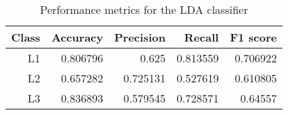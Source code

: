     \begin{table}  \centering \caption{Performance metrics for the LDA classifier}  \label{tab:results_lda} \begin{tabular}{rrrrr}    \hline\hline    \textbf{Class} & \textbf{Accuracy} & \textbf{Precision} & \textbf{Recall} & \textbf{F1 score} \\\hline    L1 & 0.806796 & 0.625 & 0.813559 & 0.706922 \\    L2 & 0.657282 & 0.725131 & 0.527619 & 0.610805 \\    L3 & 0.836893 & 0.579545 & 0.728571 & 0.64557 \\\hline\hline  \end{tabular}\end{table}